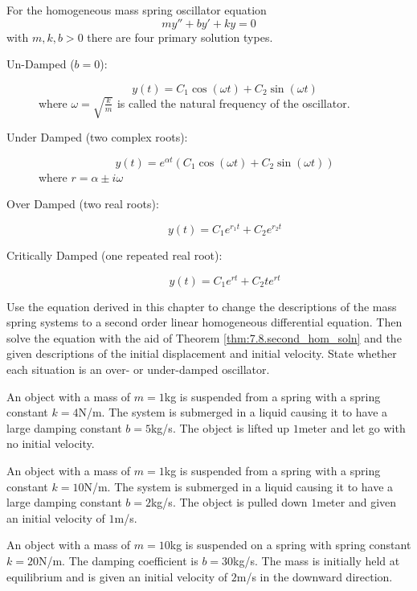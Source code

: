\begin{thm}
    For the homogeneous mass spring oscillator equation 
    \[ my'' + by' + ky = 0 \]
    with $m, k, b > 0$ there are four primary solution types.
    \begin{description}
        \item[Un-Damped ($b = 0$):]
                \[ y(t) = C_1 \cos(\omega t) + C_2 \sin(\omega t) \]
                where $\omega = \sqrt{\frac{k}{m}}$ is called the natural frequency of the
                oscillator.
        \item[Under Damped (two complex roots):] 
            \[ y(t) = e^{\alpha t} \left( C_1 \cos(\omega t) + C_2
                \sin(\omega t) \right) \]
            where $r = \alpha \pm i \omega$
        \item[Over Damped (two real roots):] 
            \[y(t) = C_1 e^{r_1 t} + C_2 e^{r_2 t}\]
        \item[Critically Damped (one repeated real root):] 
            \[ y(t) = C_1 e^{rt} + C_2 t e^{rt} \]
    \end{description}
\end{thm}




\begin{problem}
Use the equation derived in this chapter to change the descriptions of
the mass spring systems to a second order linear homogeneous differential equation.  Then
solve the equation with the aid of Theorem \ref{thm:7.8.second_hom_soln} and the given
descriptions of the initial displacement and initial velocity. State whether each
situation is an over- or under-damped oscillator.
\ba
    \item An object with a mass of $m=1$kg is suspended from a spring with a spring
        constant $k=4$N/m.  The system is submerged in a liquid causing it to have a large
        damping constant $b=5$kg/s. The object is lifted up $1$meter and let go with no
        initial velocity.
    \item An object with a mass of $m=1$kg is suspended from a spring with a spring
        constant $k=10$N/m.  The system is submerged in a liquid causing it to have a large
        damping constant $b=2$kg/s. The object is pulled down $1$meter and given an
        initial velocity of $1$m/s.
    \item An object with a mass of $m=10$kg is suspended on a spring with spring constant
        $k=20$N/m.  The damping coefficient is $b=30$kg/s. The mass is initially held at
        equilibrium and is given an initial velocity of $2$m/s in the downward direction.
\ea
\end{problem}


